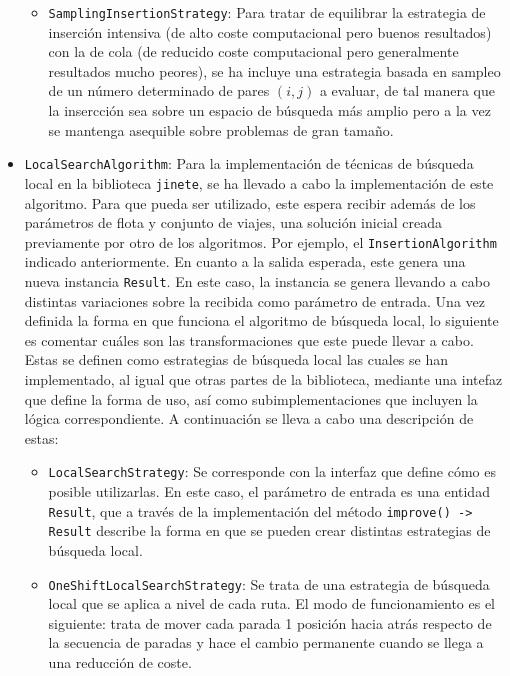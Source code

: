 \documentclass{subfiles}
\begin{document}
\begin{itemize}
\begin{itemize}
                      \item \texttt{SamplingInsertionStrategy}: Para tratar de equilibrar la estrategia de inserción intensiva (de alto coste computacional pero buenos resultados) con la de cola (de reducido coste computacional pero generalmente resultados mucho peores), se ha incluye una estrategia basada en sampleo de un número determinado de pares $(i, j)$ a evaluar, de tal manera que la insercción sea sobre un espacio de búsqueda más amplio pero a la vez se mantenga asequible sobre problemas de gran tamaño.

                  \end{itemize}

              \item \texttt{LocalSearchAlgorithm}: Para la implementación de técnicas de búsqueda local en la biblioteca \texttt{jinete}, se ha llevado a cabo la implementación de este algoritmo. Para que pueda ser utilizado, este espera recibir además de los parámetros de flota y conjunto de viajes, una solución inicial creada previamente por otro de los algoritmos. Por ejemplo, el \texttt{InsertionAlgorithm} indicado anteriormente. En cuanto a la salida esperada, este genera una nueva instancia \texttt{Result}. En este caso, la instancia se genera llevando a cabo distintas variaciones sobre la recibida como parámetro de entrada. Una vez definida la forma en que funciona el algoritmo de búsqueda local, lo siguiente es comentar cuáles son las transformaciones que este puede llevar a cabo. Estas se definen como estrategias de búsqueda local las cuales se han implementado, al igual que otras partes de la biblioteca, mediante una intefaz que define la forma de uso, así como subimplementaciones que incluyen la lógica correspondiente. A continuación se lleva a cabo una descripción de estas:

                  \begin{itemize}

                      \item \texttt{LocalSearchStrategy}: Se corresponde con la interfaz que define cómo es posible utilizarlas. En este caso, el parámetro de entrada es una entidad \texttt{Result}, que a través de la implementación del método \verb|improve() -> Result| describe la forma en que se pueden crear distintas estrategias de búsqueda local.

                      \item \texttt{OneShiftLocalSearchStrategy}: Se trata de una estrategia de búsqueda local que se aplica a nivel de cada ruta. El modo de funcionamiento es el siguiente: trata de mover cada parada 1 posición hacia atrás respecto de la secuencia de paradas y hace el cambio permanente cuando se llega a una reducción de coste.


\end{itemize}
\end{itemize}
\end{document}
